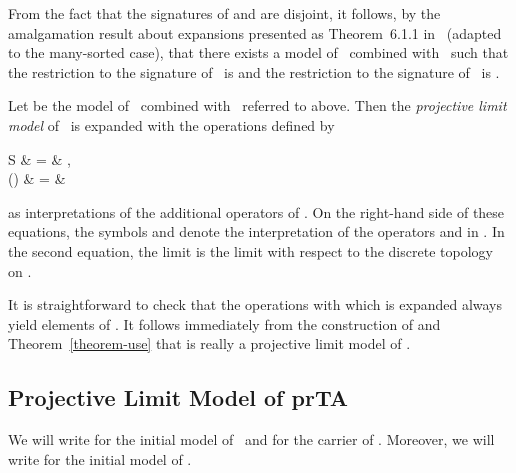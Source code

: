 \documentclass{llncs}
\begin{document}
From the fact that the signatures of  and 
are disjoint, it follows, by the amalgamation result about expansions
presented as Theorem~6.1.1 in~\cite{Hod93a} (adapted to the many-sorted
case), that there exists a model of \prBTA\ combined with \SFA\ such 
that the restriction to the signature of \prBTA\ is  and 
the restriction to the signature of \SFA\ is .

Let  be the model of \prBTA\ combined with \SFA\ 
referred to above.
Then the \emph{projective limit model}  of \prTSI\ is
 expanded with the operations defined by
\begin{ldispl}
\begin{aeqns}
 \sfuse S & = &
\;,
\\
\abstr{\Tau}() & = &
\end{aeqns}
\end{ldispl}as interpretations of the additional operators of \prTSI.
On the right-hand side of these equations, the symbols  and 
 denote the interpretation of the operators
 and  in .
In the second equation, the limit is the limit with respect to the 
discrete topology on .

It is straightforward to check that the operations with which 
 is expanded always yield elements of .
It follows immediately from the construction of  and 
Theorem~\ref{theorem-use} that  is really a projective 
limit model of \prTSI.

\subsection{Projective Limit Model of prTA\boldmath{}}
\label{app-prTAsi}

We will write  for the initial model of \prBTAnt\ and 
 for the carrier of .
Moreover, we will write  for the initial model of \prTA.
\end{document}
